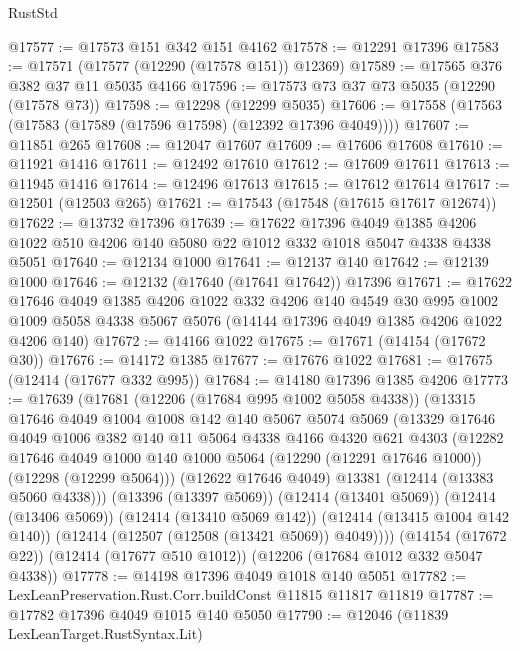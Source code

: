 \begin{lexlean}{RustStd}
\begin{coremodule}
{\begin{coremodule}
{{{{{{{{{{{{{{{{{{{{{{{{{{{{{{{{{{{{{{{{{{{{{{{{{{@17577 := @17573 @151 @342 @151 @4162
@17578 := @12291 @17396
@17583 := @17571 (@17577 (@12290 (@17578 @151)) @12369)
@17589 := @17565 @376 @382 @37 @11 @5035 @4166
@17596 := @17573 @73 @37 @73 @5035 (@12290 (@17578 @73))
@17598 := @12298 (@12299 @5035)
@17606 := @17558 (@17563 (@17583 (@17589 (@17596 @17598) (@12392 @17396 @4049))))
@17607 := @11851 @265
@17608 := @12047 @17607
@17609 := @17606 @17608
@17610 := @11921 @1416
@17611 := @12492 @17610
@17612 := @17609 @17611
@17613 := @11945 @1416
@17614 := @12496 @17613
@17615 := @17612 @17614
@17617 := @12501 (@12503 @265)
@17621 := @17543 (@17548 (@17615 @17617 @12674))
@17622 := @13732 @17396
@17639 := @17622
    @17396
    @4049
    @1385
    @4206
    @1022
    @510
    @4206
    @140
    @5080
    @22
    @1012
    @332
    @1018
    @5047
    @4338
    @4338
    @5051
@17640 := @12134 @1000
@17641 := @12137 @140
@17642 := @12139 @1000
@17646 := @12132 (@17640 (@17641 @17642)) @17396
@17671 := @17622
    @17646
    @4049
    @1385
    @4206
    @1022
    @332
    @4206
    @140
    @4549
    @30
    @995
    @1002
    @1009
    @5058
    @4338
    @5067
    @5076
    (@14144 @17396 @4049 @1385 @4206 @1022 @4206 @140)
@17672 := @14166 @1022
@17675 := @17671 (@14154 (@17672 @30))
@17676 := @14172 @1385
@17677 := @17676 @1022
@17681 := @17675 (@12414 (@17677 @332 @995))
@17684 := @14180 @17396 @1385 @4206
@17773 := @17639
    (@17681
      (@12206 (@17684 @995 @1002 @5058 @4338))
      (@13315
        @17646
        @4049
        @1004
        @1008
        @142
        @140
        @5067
        @5074
        @5069
        (@13329
          @17646
          @4049
          @1006
          @382
          @140
          @11
          @5064
          @4338
          @4166
          @4320
          @621
          @4303
          (@12282
            @17646
            @4049
            @1000
            @140
            @1000
            @5064
            (@12290 (@12291 @17646 @1000))
            (@12298 (@12299 @5064)))
          (@12622 @17646 @4049)
          @13381
          (@12414 (@13383 @5060 @4338)))
        (@13396 (@13397 @5069))
        (@12414 (@13401 @5069))
        (@12414 (@13406 @5069))
        (@12414 (@13410 @5069 @142))
        (@12414 (@13415 @1004 @142 @140))
        (@12414 (@12507 (@12508 (@13421 @5069)) @4049))))
    (@14154 (@17672 @22))
    (@12414 (@17677 @510 @1012))
    (@12206 (@17684 @1012 @332 @5047 @4338))
@17778 := @14198 @17396 @4049 @1018 @140 @5051
@17782 := LexLeanPreservation.Rust.Corr.buildConst @11815 @11817 @11819
@17787 := @17782 @17396 @4049 @1015 @140 @5050
@17790 := @12046 (@11839 LexLeanTarget.RustSyntax.Lit)
}}}}}}}}}}}}}}}}}}}}}}}}}}}}}}}}}}}}}}}}}}}}}}}}}}
\end{coremodule}}
\end{coremodule}
\end{lexlean}
